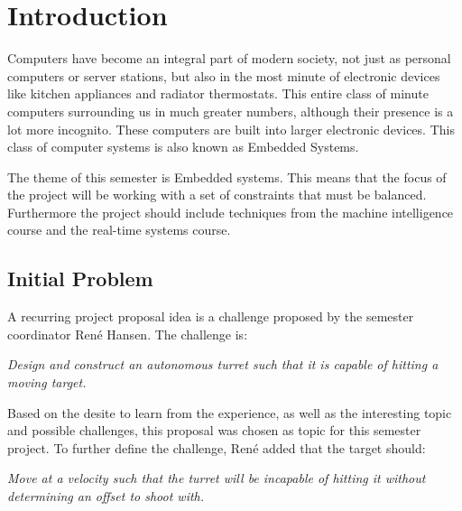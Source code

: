 \chapter{Introduction}
Computers have become an integral part of modern society, not just as personal
computers or server stations, but also in the most minute of electronic devices
like kitchen appliances and radiator thermostats. This entire class of minute
computers surrounding us in much greater numbers, although their presence is a
lot more incognito. These computers are built into larger electronic devices.
This class of computer systems is also known as Embedded Systems.\nl

The theme of this semester is Embedded systems. This means that the focus of
the project will be working with a set of constraints that must be balanced.
Furthermore the project should include techniques from the machine intelligence
course and the real-time systems course.


\section{Initial Problem}
A recurring project proposal idea is a challenge proposed by the semester coordinator Ren\'e
Hansen. The challenge is:

\begin{center}
\begin{minipage}{0.8\linewidth}
\textit{Design and construct an autonomous turret such that it is capable of
hitting a moving target.}
\end{minipage}
\end{center}

Based on the desite to learn from the experience, as well as the interesting
topic and possible challenges, this proposal was chosen as topic for this
semester project. To further define the challenge, Ren\'e added that the target
should:
\begin{center}
\begin{minipage}{0.8\linewidth}
\textit{Move at a velocity such that the turret will be incapable
of hitting it without determining an offset to shoot with.}
\end{minipage}
\end{center}

